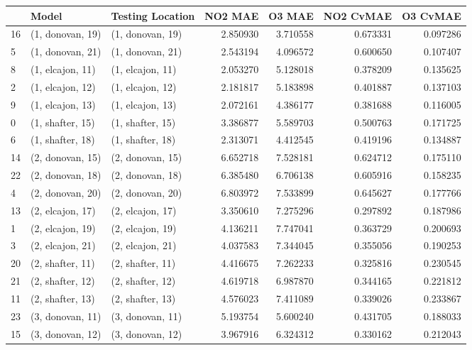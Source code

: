 \begin{tabular}{lllrrrr}
\toprule
{} &             Model &  Testing Location &   NO2 MAE &    O3 MAE &  NO2 CvMAE &  O3 CvMAE \\
\midrule
16 &  (1, donovan, 19) &  (1, donovan, 19) &  2.850930 &  3.710558 &   0.673331 &  0.097286 \\
5  &  (1, donovan, 21) &  (1, donovan, 21) &  2.543194 &  4.096572 &   0.600650 &  0.107407 \\
8  &  (1, elcajon, 11) &  (1, elcajon, 11) &  2.053270 &  5.128018 &   0.378209 &  0.135625 \\
2  &  (1, elcajon, 12) &  (1, elcajon, 12) &  2.181817 &  5.183898 &   0.401887 &  0.137103 \\
9  &  (1, elcajon, 13) &  (1, elcajon, 13) &  2.072161 &  4.386177 &   0.381688 &  0.116005 \\
0  &  (1, shafter, 15) &  (1, shafter, 15) &  3.386877 &  5.589703 &   0.500763 &  0.171725 \\
6  &  (1, shafter, 18) &  (1, shafter, 18) &  2.313071 &  4.412545 &   0.419196 &  0.134887 \\
14 &  (2, donovan, 15) &  (2, donovan, 15) &  6.652718 &  7.528181 &   0.624712 &  0.175110 \\
22 &  (2, donovan, 18) &  (2, donovan, 18) &  6.385480 &  6.706138 &   0.605916 &  0.158235 \\
4  &  (2, donovan, 20) &  (2, donovan, 20) &  6.803972 &  7.533899 &   0.645627 &  0.177766 \\
13 &  (2, elcajon, 17) &  (2, elcajon, 17) &  3.350610 &  7.275296 &   0.297892 &  0.187986 \\
1  &  (2, elcajon, 19) &  (2, elcajon, 19) &  4.136211 &  7.747041 &   0.363729 &  0.200693 \\
3  &  (2, elcajon, 21) &  (2, elcajon, 21) &  4.037583 &  7.344045 &   0.355056 &  0.190253 \\
20 &  (2, shafter, 11) &  (2, shafter, 11) &  4.416675 &  7.262233 &   0.325816 &  0.230545 \\
21 &  (2, shafter, 12) &  (2, shafter, 12) &  4.619718 &  6.987870 &   0.344165 &  0.221812 \\
11 &  (2, shafter, 13) &  (2, shafter, 13) &  4.576023 &  7.411089 &   0.339026 &  0.233867 \\
23 &  (3, donovan, 11) &  (3, donovan, 11) &  5.193754 &  5.600240 &   0.431705 &  0.188033 \\
15 &  (3, donovan, 12) &  (3, donovan, 12) &  3.967916 &  6.324312 &   0.330162 &  0.212043 \\

\end{tabular}
